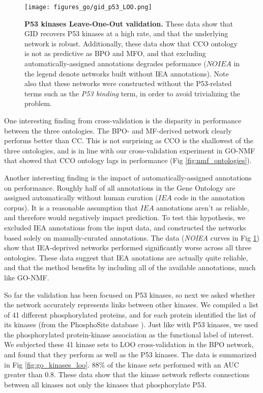 \documentclass[12pt,a4paper]{report}
\begin{document}
{{\begin{figure}
\begin{minipage}[c][\textheight]{\textwidth}
\vspace*{-5in}
\centering
  \texttt{[image: figures\_go/gid\_p53\_LOO.png]}
  \caption[P53 kinases LOO validation.]{\textbf{P53 kinases Leave-One-Out validation.} These data show that GID recovers P53 kinases at a high rate, and that the underlying network is robust. Additionally, these data show that CCO ontology is not as predictive as BPO and MFO, and that excluding automatically-assigned annotations degrades peformance ($NOIEA$ in the legend denote networks built without IEA annotations). Note also that these networks were constructed without the P53-related terms such as the \textit{P53 binding} term, in order to avoid trivializing the problem.}
  \label{fig:go_p53_loo}
  \end{minipage}

\end{figure}

One interesting finding from cross-validation is the disparity in performance between the three ontologies. The BPO- and MF-derived network clearly performs better than CC. This is not surprising as CCO is the shallowest of the three ontologies, and is in line with our cross-validation experiment in GO-NMF that showed that CCO ontology lags in performance (Fig \ref{fig:nmf_ontologies}).

Another interesting finding is the impact of automatically-assigned annotations on performance. Roughly half of all annotations in the Gene Ontology are assigned automatically without human curation ($IEA$ code in the annotation corpus). It is a reasonable assumption that $IEA$ annotations aren't as reliable, and therefore would negatively impact prediction. To test this hypothesis, we excluded IEA annotations from the input data, and constructed the networks based solely on manually-curated annotations. The data (\textit{NOIEA} curves in Fig \ref{fig:go_p53_loo}) show that IEA-deprived networks performed significantly worse across all three ontologies. These data suggest that IEA anotations are actually quite reliable, and that the method benefits by including all of the available annotations, much like GO-NMF.

So far the validation has been focused on P53 kinases, so next we asked whether the network accurately represents links between other kinases. We compiled a list of 41 different phosphorylated proteins, and for each protein identified the list of its kinases (from the PhosphoSite database \cite{ppsite}). Just like with P53 kinases, we used the phosphorylated protein-kinase association as the functional label of interest. We subjected these 41 kinase sets to LOO cross-validation in the BPO network, and found that they perform as well as the P53 kinases. The data is summarized in Fig \ref{fig:go_kinases_loo}. 88\% of the kinase sets performed with an AUC greater than 0.8. These data show that the kinase network reflects connections between all kinases not only the kinases that phosphorylate P53.

}}
\end{document}
